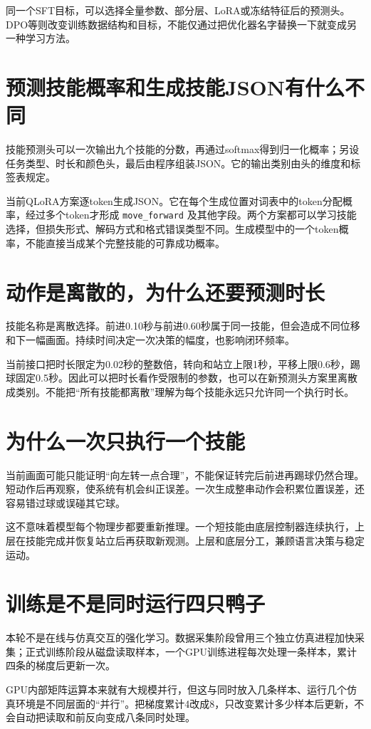 同一个SFT目标，可以选择全量参数、部分层、LoRA或冻结特征后的预测头。DPO等则改变训练数据结构和目标，不能仅通过把优化器名字替换一下就变成另一种学习方法。

\section{预测技能概率和生成技能JSON有什么不同}
技能预测头可以一次输出九个技能的分数，再通过softmax得到归一化概率；另设任务类型、时长和颜色头，最后由程序组装JSON。它的输出类别由头的维度和标签表规定。

当前QLoRA方案逐token生成JSON。它在每个生成位置对词表中的token分配概率，经过多个token才形成 \texttt{move\_forward} 及其他字段。两个方案都可以学习技能选择，但损失形式、解码方式和格式错误类型不同。生成模型中的一个token概率，不能直接当成某个完整技能的可靠成功概率。

\section{动作是离散的，为什么还要预测时长}
技能名称是离散选择。前进0.10秒与前进0.60秒属于同一技能，但会造成不同位移和下一幅画面。持续时间决定一次决策的幅度，也影响闭环频率。

当前接口把时长限定为0.02秒的整数倍，转向和站立上限1秒，平移上限0.6秒，踢球固定0.5秒。因此可以把时长看作受限制的参数，也可以在新预测头方案里离散成类别。不能把“所有技能都离散”理解为每个技能永远只允许同一个执行时长。

\section{为什么一次只执行一个技能}
当前画面可能只能证明“向左转一点合理”，不能保证转完后前进再踢球仍然合理。短动作后再观察，使系统有机会纠正误差。一次生成整串动作会积累位置误差，还容易错过球或误碰其它球。

这不意味着模型每个物理步都要重新推理。一个短技能由底层控制器连续执行，上层在技能完成并恢复站立后再获取新观测。上层和底层分工，兼顾语言决策与稳定运动。

\section{训练是不是同时运行四只鸭子}
本轮不是在线与仿真交互的强化学习。数据采集阶段曾用三个独立仿真进程加快采集；正式训练阶段从磁盘读取样本，一个GPU训练进程每次处理一条样本，累计四条的梯度后更新一次。

GPU内部矩阵运算本来就有大规模并行，但这与同时放入几条样本、运行几个仿真环境是不同层面的“并行”。把梯度累计4改成8，只改变累计多少样本后更新，不会自动把读取和前反向变成八条同时处理。

